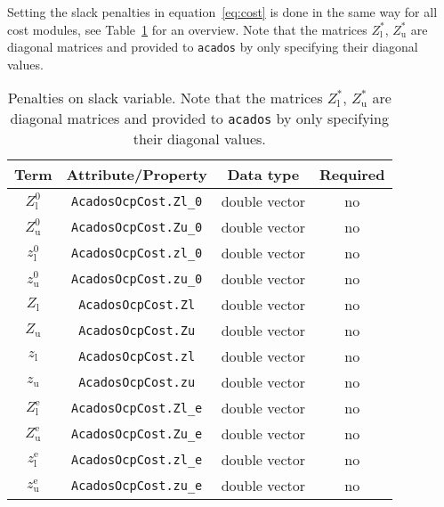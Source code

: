 \documentclass[english]{article}
\newcommand{\code}[1]{\texttt{#1}}
\newcommand{\acados}{\texttt{acados}}
\newcommand{\ind}[1]{_{\textrm{#1}}}
\newcommand{\terminal}{^{\textrm{e}}}
\newcommand{\initial}{^{\textrm{0}}}
\newcommand{\Lower}{\ind{l}}
\newcommand{\upper}{\ind{u}}
\newcommand{\optional}{no}
\begin{document}
Setting the slack penalties in equation~\eqref{eq:cost} is done in the same way for all cost modules, see Table~\ref{tab:cost:slack} for an overview.
Note that the matrices $Z\Lower^*$, $Z\upper^*$ are diagonal matrices and provided to \acados{} by only specifying their diagonal values.

%
\begin{table}[ht!]
    \centering
    \begin{tabular}{cccc}
        \toprule
        Term  & Attribute/Property & Data type & Required \\ \midrule
        $ Z\Lower\initial $ & \code{AcadosOcpCost.Zl\_0} & double vector & \optional   \\[3pt]
        $ Z\upper\initial $ & \code{AcadosOcpCost.Zu\_0} & double vector & \optional   \\[3pt]
        $ z\Lower\initial $ & \code{AcadosOcpCost.zl\_0} & double vector  & \optional   \\[3pt]
        $ z\upper\initial $ & \code{AcadosOcpCost.zu\_0} & double vector  & \optional   \\[10pt]
        $ Z\Lower $          & \code{AcadosOcpCost.Zl}    & double vector  & \optional \\[3pt]
        $ Z\upper $          & \code{AcadosOcpCost.Zu}    & double vector  & \optional   \\[3pt]
        $ z\Lower $          & \code{AcadosOcpCost.zl}    & double vector  & \optional   \\[3pt]
        $ z\upper $          & \code{AcadosOcpCost.zu}    & double vector  & \optional   \\[10pt]
        $ Z\Lower\terminal $ & \code{AcadosOcpCost.Zl\_e} & double vector & \optional   \\[3pt]
        $ Z\upper\terminal $ & \code{AcadosOcpCost.Zu\_e} & double vector & \optional   \\[3pt]
        $ z\Lower\terminal $ & \code{AcadosOcpCost.zl\_e} & double vector  & \optional   \\[3pt]
        $ z\upper\terminal $ & \code{AcadosOcpCost.zu\_e} & double vector  & \optional   \\[3pt]
        \bottomrule
    \end{tabular}
    \caption{Penalties on slack variable.
    Note that the matrices $Z\Lower^*$, $Z\upper^*$ are diagonal matrices and provided to \acados{} by only specifying their diagonal values.} \label{tab:cost:slack}
\end{table}
\end{document}
